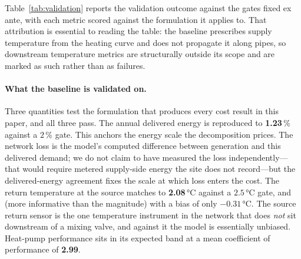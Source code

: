 
Table~\ref{tab:validation} reports the validation outcome against the gates fixed ex ante,
with each metric scored against the formulation it applies to. That attribution is
essential to reading the table: the baseline prescribes supply temperature from the heating
curve and does not propagate it along pipes, so downstream temperature metrics are
structurally outside its scope and are marked as such rather than as failures.

\paragraph{What the baseline is validated on.}
Three quantities test the formulation that produces every cost result in this paper, and
all three pass. The annual delivered energy is reproduced to \textbf{1.23}\,\% against a
$2$\,\% gate. This anchors the energy scale the
decomposition prices. The network loss is the model's computed difference between generation
and this delivered demand; we do not claim to have measured the loss independently---that
would require metered supply-side energy the site does not record---but the delivered-energy
agreement fixes the scale at which loss enters the cost. The return temperature at
the source matches to \textbf{2.08}\,°C against a $2.5$\,°C gate, and (more informative
than the magnitude) with a bias of only $-0.31$\,°C. The source return sensor is the one
temperature instrument in the network that does \emph{not} sit downstream of a mixing valve,
and against it the model is essentially unbiased. Heat-pump performance sits in its expected
band at a mean coefficient of performance of \textbf{2.99}.

